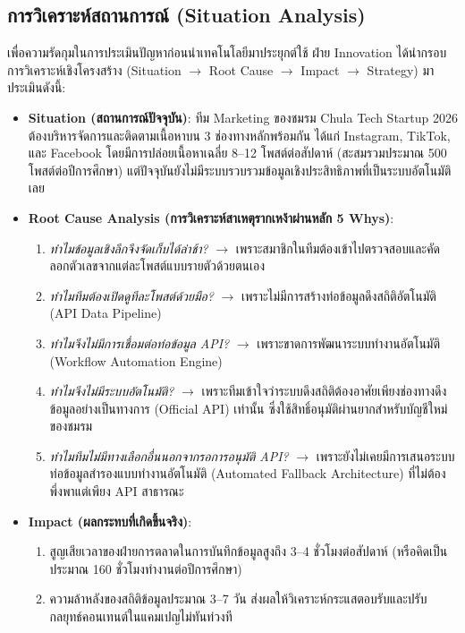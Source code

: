 \documentclass[10pt,a4paper]{article}
\begin{document}
\subsection{การวิเคราะห์สถานการณ์ (Situation Analysis)}
เพื่อความรัดกุมในการประเมินปัญหาก่อนนำเทคโนโลยีมาประยุกต์ใช้ ฝ่าย Innovation ได้นำกรอบการวิเคราะห์เชิงโครงสร้าง (Situation $\rightarrow$ Root Cause $\rightarrow$ Impact $\rightarrow$ Strategy) มาประเมินดังนี้:
\begin{itemize}
  \item \textbf{Situation (สถานการณ์ปัจจุบัน)}: ทีม Marketing ของชมรม Chula Tech Startup 2026 ต้องบริหารจัดการและติดตามเนื้อหาบน 3 ช่องทางหลักพร้อมกัน ได้แก่ Instagram, TikTok, และ Facebook โดยมีการปล่อยเนื้อหาเฉลี่ย 8--12 โพสต์ต่อสัปดาห์ (สะสมรวมประมาณ 500 โพสต์ต่อปีการศึกษา) แต่ปัจจุบันยังไม่มีระบบรวบรวมข้อมูลเชิงประสิทธิภาพที่เป็นระบบอัตโนมัติเลย
  \item \textbf{Root Cause Analysis (การวิเคราะห์สาเหตุรากเหง้าผ่านหลัก 5 Whys)}:
    \begin{enumerate}
      \item \textit{ทำไมข้อมูลเชิงลึกจึงจัดเก็บได้ล่าช้า?} $\rightarrow$ เพราะสมาชิกในทีมต้องเข้าไปตรวจสอบและคัดลอกตัวเลขจากแต่ละโพสต์แบบรายตัวด้วยตนเอง
      \item \textit{ทำไมทีมต้องเปิดดูทีละโพสต์ด้วยมือ?} $\rightarrow$ เพราะไม่มีการสร้างท่อข้อมูลดึงสถิติอัตโนมัติ (API Data Pipeline)
      \item \textit{ทำไมจึงไม่มีการเชื่อมต่อท่อข้อมูล API?} $\rightarrow$ เพราะขาดการพัฒนาระบบทำงานอัตโนมัติ (Workflow Automation Engine)
      \item \textit{ทำไมจึงไม่มีระบบอัตโนมัติ?} $\rightarrow$ เพราะทีมเข้าใจว่าระบบดึงสถิติต้องอาศัยเพียงช่องทางดึงข้อมูลอย่างเป็นทางการ (Official API) เท่านั้น ซึ่งใช้สิทธิ์อนุมัติผ่านยากสำหรับบัญชีใหม่ของชมรม
      \item \textit{ทำไมทีมไม่มีทางเลือกอื่นนอกจากรอการอนุมัติ API?} $\rightarrow$ เพราะยังไม่เคยมีการเสนอระบบท่อข้อมูลสำรองแบบทำงานอัตโนมัติ (Automated Fallback Architecture) ที่ไม่ต้องพึ่งพาแต่เพียง API สาธารณะ
    \end{enumerate}
  \item \textbf{Impact (ผลกระทบที่เกิดขึ้นจริง)}: 
    \begin{enumerate}[label=\alph*)]
      \item สูญเสียเวลาของฝ่ายการตลาดในการบันทึกข้อมูลสูงถึง 3--4 ชั่วโมงต่อสัปดาห์ (หรือคิดเป็นประมาณ 160 ชั่วโมงทำงานต่อปีการศึกษา)
      \item ความล้าหลังของสถิติข้อมูลประมาณ 3--7 วัน ส่งผลให้วิเคราะห์กระแสตอบรับและปรับกลยุทธ์คอนเทนต์ในแคมเปญไม่ทันท่วงที

\end{enumerate}
\end{itemize}
\end{document}
